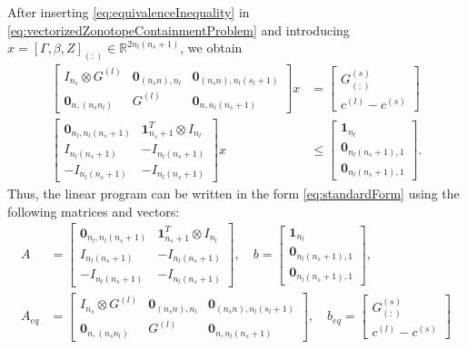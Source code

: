 \documentclass[10pt,a4paper]{article}
\renewcommand{\^}[1]{^{(#1)}}
\begin{document}
After inserting \eqref{eq:equivalenceInequality} in \eqref{eq:vectorizedZonotopeContainmentProblem} and introducing 
$x=[\Gamma, \beta, Z]_{(:)} \in \mathbb{R}^{2 n_l(n_s+1)}$, we obtain
\begin{equation*} 
\begin{split}
  \begin{bmatrix} I_{n_s} \otimes G\^l & \mathbf{0}_{(n_s n) , n_l} & \mathbf{0}_{(n_s n) , n_l(s_l+1)} \\ 
  \mathbf{0}_{n , (n_s n_l)} & G\^l & \mathbf{0}_{n , n_l(n_s+1)} \end{bmatrix} x &= \begin{bmatrix} G\^s_{(:)} \\ c\^l -  c\^s \end{bmatrix}  \\
  \begin{bmatrix} \mathbf{0}_{n_l , n_l(n_s+1)} & \mathbf{1}_{n_s+1}^T \otimes I_{n_l}  \\
  I_{n_l(n_s+1)} & - I_{n_l(n_s+1)} \\
  - I_{n_l(n_s+1)} & - I_{n_l(n_s+1)}
  \end{bmatrix} x &\leq \begin{bmatrix} \mathbf{1}_{n_l} \\ \mathbf{0}_{n_l(n_s+1) , 1} \\ \mathbf{0}_{n_l(n_s+1) , 1} \end{bmatrix}.
\end{split}
\end{equation*}
Thus, the linear program can be written in the form \eqref{eq:standardForm} using the following matrices and vectors:
\begin{equation*}
 \begin{split}
  A &= \begin{bmatrix} \mathbf{0}_{n_l, n_l(n_s+1)} & \mathbf{1}_{n_s+1}^T \otimes I_{n_l}  \\
  I_{n_l(n_s+1)} & - I_{n_l(n_s+1)} \\
  - I_{n_l(n_s+1)} & - I_{n_l(n_s+1)}
  \end{bmatrix}, \quad b = \begin{bmatrix} \mathbf{1}_{n_l} \\ \mathbf{0}_{n_l(n_s+1) , 1} \\ \mathbf{0}_{n_l(n_s+1) , 1} \end{bmatrix}, \\
  A_{eq} &= \begin{bmatrix} I_{n_s} \otimes G\^l & \mathbf{0}_{(n_s n) , n_l} & \mathbf{0}_{(n_s n) , n_l(s_l+1)} \\ 
  \mathbf{0}_{n , (n_s n_l)} & G\^l & \mathbf{0}_{n , n_l(n_s+1)} \end{bmatrix}, \quad b_{eq}= \begin{bmatrix} G\^s_{(:)} \\ c\^l -  c\^s \end{bmatrix}
 \end{split}
\end{equation*}
\end{document}
